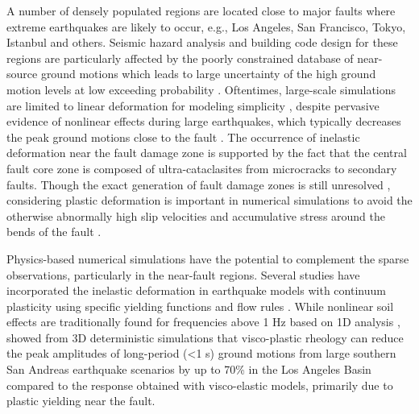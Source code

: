 A number of densely populated regions are located close to major faults where extreme earthquakes are likely to occur, e.g., Los Angeles, San Francisco, Tokyo, Istanbul and others. Seismic hazard analysis and building code design for these regions are particularly affected by the poorly constrained database of near-source ground motions which leads to large uncertainty of the high ground motion levels at low exceeding probability .  Oftentimes, large-scale simulations are limited to linear deformation for modeling simplicity \citep{olsen20083d,molnar2014earthquake}, despite pervasive evidence of nonlinear effects during large earthquakes, which typically decreases the peak ground motions close to the fault \citep{andrewsPhysicalLimitsGround2007,maPhysicalModelWidespread2008,duanSensitivityStudyPhysical2010,templetonDynamicRuptureBranched2010,dunhamEarthquakeRupturesStrongly2011}. The occurrence of inelastic deformation near the fault damage zone is supported by the fact that the central fault core zone is composed of ultra-cataclasites from microcracks to secondary faults. Though the exact generation of fault damage zones is still unresolved \citep{mitchellNatureOriginOfffault2009}, considering plastic deformation is important in numerical simulations to avoid the otherwise abnormally high slip velocities and accumulative stress around the bends of the fault \citep{nodaEarthquakeRupturesThermal2009,dunhamEarthquakeRupturesStrongly2011a}.

Physics-based numerical simulations have the potential to complement the sparse observations, particularly in the near-fault regions.
Several studies have incorporated the inelastic deformation in earthquake models with continuum plasticity using specific yielding functions and flow rules \citep[e.g. Mohr-Coulomb or Drucker–Prager formulations; ][]{andrewsRuptureDynamicsEnergy2005,maRuptureDynamicsBimaterial2008,duanSensitivityStudyPhysical2010,dunhamEarthquakeRupturesStrongly2011,rotenExpectedSeismicShaking2014}.
 While nonlinear soil effects are traditionally found for frequencies above 1 Hz based on 1D analysis \citep{fieldNonlinearSiteResponse1998},  \citet{rotenExpectedSeismicShaking2014} showed from 3D deterministic simulations that visco-plastic rheology can reduce the peak amplitudes of long-period (<1 s) ground motions from large southern San Andreas earthquake scenarios by up to 70\% in the Los Angeles Basin compared to the response obtained with visco-elastic models, primarily due to plastic yielding near the fault.
 
